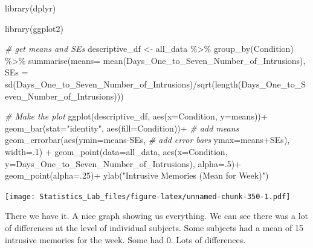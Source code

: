 \documentclass[
]{book}
\newenvironment{Shaded}{\begin{snugshade}}{\end{snugshade}}
\newcommand{\AttributeTok}[1]{\textcolor[rgb]{0.77,0.63,0.00}{#1}}
\newcommand{\CommentTok}[1]{\textcolor[rgb]{0.56,0.35,0.01}{\textit{#1}}}
\newcommand{\DecValTok}[1]{\textcolor[rgb]{0.00,0.00,0.81}{#1}}
\newcommand{\FunctionTok}[1]{\textcolor[rgb]{0.00,0.00,0.00}{#1}}
\newcommand{\NormalTok}[1]{#1}
\newcommand{\OtherTok}[1]{\textcolor[rgb]{0.56,0.35,0.01}{#1}}
\newcommand{\SpecialCharTok}[1]{\textcolor[rgb]{0.00,0.00,0.00}{#1}}
\newcommand{\StringTok}[1]{\textcolor[rgb]{0.31,0.60,0.02}{#1}}
\begin{document}
\begin{Shaded}
\begin{Highlighting}[]
\FunctionTok{library}\NormalTok{(dplyr)}

\FunctionTok{library}\NormalTok{(ggplot2)}

\CommentTok{\# get means and SEs}
\NormalTok{descriptive\_df }\OtherTok{\textless{}{-}}\NormalTok{ all\_data }\SpecialCharTok{\%\textgreater{}\%} 
                    \FunctionTok{group\_by}\NormalTok{(Condition) }\SpecialCharTok{\%\textgreater{}\%} 
                    \FunctionTok{summarise}\NormalTok{(}\AttributeTok{means=} \FunctionTok{mean}\NormalTok{(Days\_One\_to\_Seven\_Number\_of\_Intrusions),}
                              \AttributeTok{SEs =} \FunctionTok{sd}\NormalTok{(Days\_One\_to\_Seven\_Number\_of\_Intrusions)}\SpecialCharTok{/}\FunctionTok{sqrt}\NormalTok{(}\FunctionTok{length}\NormalTok{(Days\_One\_to\_Seven\_Number\_of\_Intrusions)))}

\CommentTok{\# Make the plot}
\FunctionTok{ggplot}\NormalTok{(descriptive\_df, }\FunctionTok{aes}\NormalTok{(}\AttributeTok{x=}\NormalTok{Condition, }\AttributeTok{y=}\NormalTok{means))}\SpecialCharTok{+} 
  \FunctionTok{geom\_bar}\NormalTok{(}\AttributeTok{stat=}\StringTok{"identity"}\NormalTok{, }\FunctionTok{aes}\NormalTok{(}\AttributeTok{fill=}\NormalTok{Condition))}\SpecialCharTok{+} \CommentTok{\# add means}
  \FunctionTok{geom\_errorbar}\NormalTok{(}\FunctionTok{aes}\NormalTok{(}\AttributeTok{ymin=}\NormalTok{means}\SpecialCharTok{{-}}\NormalTok{SEs,               }\CommentTok{\# add error bars}
                    \AttributeTok{ymax=}\NormalTok{means}\SpecialCharTok{+}\NormalTok{SEs), }\AttributeTok{width=}\NormalTok{.}\DecValTok{1}\NormalTok{) }\SpecialCharTok{+}
  \FunctionTok{geom\_point}\NormalTok{(}\AttributeTok{data=}\NormalTok{all\_data, }\FunctionTok{aes}\NormalTok{(}\AttributeTok{x=}\NormalTok{Condition, }\AttributeTok{y=}\NormalTok{Days\_One\_to\_Seven\_Number\_of\_Intrusions), }\AttributeTok{alpha=}\NormalTok{.}\DecValTok{5}\NormalTok{)}\SpecialCharTok{+}
  \FunctionTok{geom\_point}\NormalTok{(}\AttributeTok{alpha=}\NormalTok{.}\DecValTok{25}\NormalTok{)}\SpecialCharTok{+}
  \FunctionTok{ylab}\NormalTok{(}\StringTok{"Intrusive Memories (Mean for Week)"}\NormalTok{)}
\end{Highlighting}
\end{Shaded}

\texttt{[image: Statistics\_Lab\_files/figure-latex/unnamed-chunk-350-1.pdf]}

There we have it. A nice graph showing us everything. We can see there was a lot of differences at the level of individual subjects. Some subjects had a mean of 15 intrusive memories for the week. Some had 0. Lots of differences.
\end{document}
